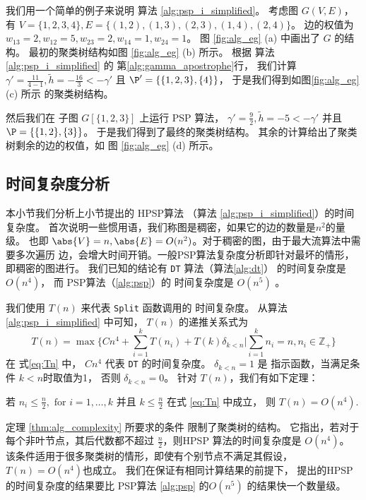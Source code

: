 \begin{example}
	我们用一个简单的例子来说明
  算法 \ref{alg:psp_i_simplified}。
  考虑图 $G(V, E)$，有 $V=\{1,2,3,4\}, E=\{(1,2),(1,3),(2,3),(1,4),(2,4)\}$。
  边的权值为 $w_{13}=2, w_{12}=5, w_{23}=2, w_{14}=1, w_{24}=1$。
	图 \ref{fig:alg_eg} (a) 中画出了 $G$
  的结构。
  最初的聚类树结构如图 \ref{fig:alg_eg} (b)
  所示。
  根据 
  算法 \ref{alg:psp_i_simplified} 的
  第\ref {alg:gamma_apostrophe}行，
  我们计算 $\gamma' = \frac{11}{4-1}, \tilde{h} = -\frac{16}{3} < -\gamma' $
  且 $\P' = \{\{1,2,3\},\{4\}\}$，
  于是我们得到如图\ref{fig:alg_eg} (c) 所示
  的聚类树结构。
	
	然后我们在 子图 $G[\{1,2,3\}]$ 上运行 PSP 算法，
  $\gamma' = \frac{9}{2}, \tilde{h} = -5 < -\gamma'$
  并且 $\P= \{\{1,2\},\{3\}\}$。 
  于是我们得到了最终的聚类树结构。
  其余的计算给出了聚类树剩余的边的权值，如
  图 \ref{fig:alg_eg} (d) 所示。
\end{example}	
\subsection{时间复杂度分析}

本小节我们分析上小节提出的 HPSP算法 （算法 \ref{alg:psp_i_simplified}）的时间复杂度。
首次说明一些惯用语，我们称图是稠密，如果它的边的数量是$n^2$的量级。
也即 $\abs{V} = n, \abs{E} = O(n^2)$。对于稠密的图，由于最大流算法中需要多次遍历
边，会增大时间开销。一般PSP算法复杂度分析即针对最坏的情形，即稠密的图进行。
我们已知的结论有 \texttt{DT} 算法（算法\ref{alg:dt}）
的时间复杂度是 $O(n^4)$， 而 PSP算法（\ref{alg:psp}）的 
时间复杂度是 $O(n^5)$ \citep{pin}。

我们使用 $T(n)$ 来代表 
\texttt{Split} 函数调用的
时间复杂度。
从算法 \ref{alg:psp_i_simplified} 中可知，
$T(n)$ 的递推关系式为
\begin{equation}\label{eq:Tn}
T(n) = \max \{ C n^4 + \sum_{i=1}^k T(n_i) +
T(k)\delta_{k<n} |
\sum_{i=1}^k n_i = n, n_i \in \mathbb{Z}_{+} \}
\end{equation}
在 式\eqref{eq:Tn} 中，
$Cn^4$ 代表 \texttt{DT} 的时间复杂度。
$\delta_{k<n} = 1$ 是 指示函数，当满足条件 $k<n$时取值为1，
否则 $\delta_{k<n}=0$。
针对 $T(n)$，我们有如下定理：
\begin{theorem}\label{thm:alg_complexity}
	 若 $n_i \leq \frac{n}{2}, \textrm{ for } i=1,\dots,k$ 并且
   $ k \leq \frac{n}{2}$  在式 \eqref{eq:Tn} 中成立， 
   则 $T(n) = O(n^4)$.
\end{theorem}

定理 \ref{thm:alg_complexity} 所要求的条件
限制了聚类树的结构。
它指出，若对于每个非叶节点，其后代数都不超过 $\frac{n}{2}$，则HPSP
算法的时间复杂度是  $O(n^4)$。
该条件适用于很多聚类树的情形，即使有个别节点不满足其假设，$T(n) = O(n^4)$也成立。
我们在保证有相同计算结果的前提下，
提出的HPSP 的时间复杂度的结果要比
PSP算法 \ref{alg:psp} 的$O(n^5)$ 的结果快一个数量级。

